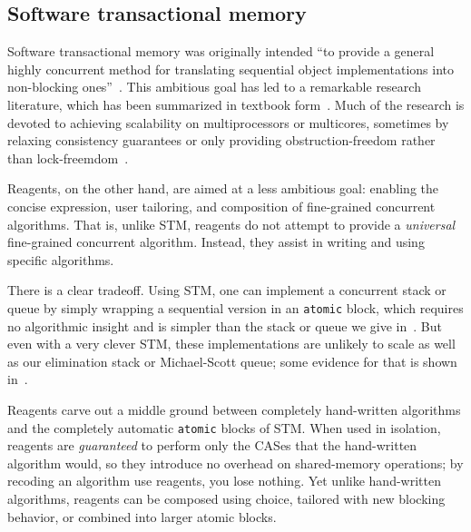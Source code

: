 \documentclass[preprint,nocopyrightspace]{sigplanconf}
\begin{document}

\subsection{Software transactional memory}
\label{sec:stm}

Software transactional memory was originally intended ``to provide a general
highly concurrent method for translating sequential object implementations into
non-blocking ones''~\cite{Shavit1997}.  This ambitious goal has led to a
remarkable research literature, which has been summarized in textbook
form~\cite{Larus2006}.  Much of the research is devoted to achieving scalability
on multiprocessors or multicores, sometimes by relaxing consistency
guarantees or only providing obstruction-freedom rather than
lock-freemdom~\cite{Herlihy2003}.  %

Reagents, on the other hand, are aimed at a less ambitious goal: enabling the
concise expression, user tailoring, and composition of fine-grained concurrent
algorithms.  That is, unlike STM, reagents do not attempt to provide a
\emph{universal} fine-grained concurrent algorithm.  Instead, they assist in
writing and using specific algorithms.  

There is a clear tradeoff.  Using STM, one can implement a concurrent stack or
queue by simply wrapping a sequential version in an \lstinline{atomic} block,
which requires no algorithmic insight and is simpler than the stack or queue
we give in~.  But even with a very clever STM, these
implementations are unlikely to scale as well as our elimination stack or
Michael-Scott queue; some evidence for that is shown in~.

Reagents carve out a middle ground between completely hand-written algorithms
and the completely automatic \lstinline{atomic} blocks of STM.  When used in
isolation, reagents are \emph{guaranteed} to perform only the CASes that the
hand-written algorithm would, so they introduce no overhead on shared-memory
operations; by recoding an algorithm use reagents, you lose nothing. Yet unlike hand-written algorithms, reagents can be
composed using choice, tailored with new blocking behavior, or combined
into larger atomic blocks. %
\end{document}
